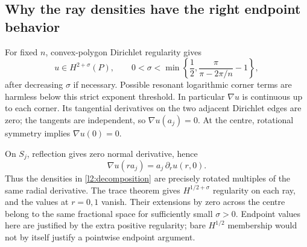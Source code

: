 \subsection{Why the ray densities have the right endpoint behavior}
For fixed $n$, convex-polygon Dirichlet regularity gives
\[
 u\in H^{2+\sigma}(P),\qquad
 0<\sigma<\min\left\{\frac12,\frac{\pi}{\pi-2\pi/n}-1\right\},
\]
after decreasing $\sigma$ if necessary. Possible resonant logarithmic
corner terms are harmless below this strict exponent threshold.
In particular $\nabla u$ is continuous up to each corner. Its tangential
derivatives on the two adjacent Dirichlet edges are zero; the tangents
are independent, so $\nabla u(a_j)=0$. At the centre, rotational symmetry
implies $\nabla u(0)=0$.

On $S_j$, reflection gives zero normal derivative, hence
\[
 \nabla u(r a_j)=a_j\,\partial_ru(r,0).
\]
Thus the densities in \eqref{l2:decomposition} are precisely rotated
multiples of the same radial derivative. The trace theorem gives
$H^{1/2+\sigma}$ regularity on each ray, and the values at $r=0,1$ vanish.
Their extensions by zero across the centre belong to the same fractional
space for sufficiently small $\sigma>0$. Endpoint values here are justified
by the extra positive regularity; bare $H^{1/2}$ membership would not by
itself justify a pointwise endpoint argument.

